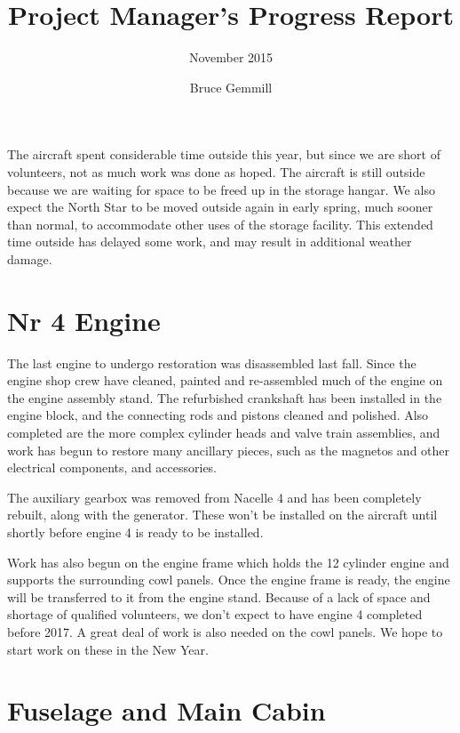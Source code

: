 %


\title{Project Manager's Progress Report}
\subtitle{November 2015}
\author{Bruce Gemmill}

\maketitle

The aircraft spent considerable time outside this year, but since we
are short of volunteers, not as much work was done as hoped.  The
aircraft is still outside because we are waiting for space to be freed
up in the storage hangar.  We also expect the North Star to be moved
outside again in early spring, much sooner than normal, to accommodate
other uses of the storage facility.  This extended time outside has
delayed some work, and may result in additional weather damage.

\section{Nr 4 Engine}
\label{sec:engine_4}

The last engine to undergo restoration was disassembled last fall.
Since the engine shop crew have cleaned, painted and re-assembled much
of the engine on the engine assembly stand. The refurbished crankshaft
has been installed in the engine block, and the connecting rods and
pistons cleaned and polished.  Also completed are the more complex
cylinder heads and valve train assemblies, and work has begun to
restore many ancillary pieces, such as the magnetos and other
electrical components, and accessories.

The auxiliary gearbox was removed from Nacelle 4 and has been
completely rebuilt, along with the generator.  These won't be
installed on the aircraft until shortly before engine 4 is ready to be
installed.

Work has also begun on the engine frame which holds the 12 cylinder
engine and supports the surrounding cowl panels.  Once the engine
frame is ready, the engine will be transferred to it from the engine
stand.  Because of a lack of space and shortage of qualified
volunteers, we don't expect to have engine 4 completed before 2017.  A
great deal of work is also needed on the cowl panels.  We hope to
start work on these in the New Year.

\section{Fuselage and Main Cabin}
\label{sec:main_cabin}

